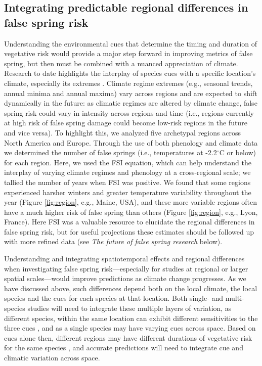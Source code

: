 \documentclass{article}\usepackage[]{graphicx}\usepackage[]{color}
\begin{document}
\subsection* {Integrating predictable regional differences in false spring risk} %
Understanding the environmental cues that determine the timing and duration of vegetative risk would provide a major step forward in improving metrics of false spring, but then must be combined with a nuanced appreciation of climate. Research to date \citep{Hanninen2011, Savolainen2007, Vitasse2009} highlights the interplay of species cues with a specific location's climate, especially its extremes \citep{Jochner2011, Reyer2013}. Climate regime extremes (e.g., seasonal trends, annual minima and annual maxima) vary across regions and are expected to shift dynamically in the future: as climatic regimes are altered by climate change, false spring risk could vary in intensity across regions and time (i.e., regions currently at high risk of false spring damage could become low-risk regions in the future and vice versa). To highlight this, we analyzed five archetypal regions across North America and Europe. Through the use of both phenology \citep{Soudani2012, Schaber2005, USA-NPN2016, White2009} and climate data \citep[from the NOAA Climate Data Online tool][]{NOAA} we determined the number of false springs (i.e., temperatures at -2.2$^{\circ}$C or below) for each region. Here, we used the FSI equation, which can help understand the interplay of varying climate regimes and phenology at a cross-regional scale; we tallied the number of years when FSI was positive. We found that some regions experienced harsher winters and greater temperature variability throughout the year (Figure \ref{fig:region}, e.g., Maine, USA), and these more variable regions often have a much higher risk of false spring than others (Figure \ref{fig:region}, e.g., Lyon, France). Here FSI was a valuable resource to elucidate the regional differences in false spring risk, but for useful projections these estimates should be followed up with more refined data (see \emph{The future of false spring research} below). 

Understanding and integrating spatiotemporal effects and regional differences when investigating false spring risk---especially for studies at regional or larger spatial scales---would improve predictions as climate change progresses. As we have discussed above, such differences depend both on the local climate, the local species and the cues for each species at that location. Both single- and multi-species studies will need to integrate these multiple layers of variation, as different species, within the same location can exhibit different sensitivities to the three cues \citep{Basler2012, Laube2013}, and as a single species may have varying cues across space. Based on cues alone then, different regions may have different durations of vegetative risk for the same species \citep {Caffarra2011, Partanen2004, Viheraaarnio2006}, and accurate predictions will need to integrate cue and climatic variation across space.
\end{document}
